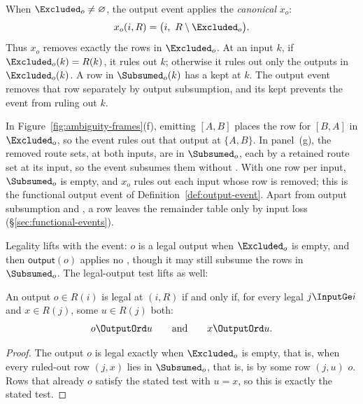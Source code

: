 \begin{definition}
\label{def:canonical-commitment}
When $\Excluded_o\neq\varnothing$, the output event applies the \emph{canonical
\commitment} $x_o$:
\begin{equation}
  x_o(i,R)=\bigl(i,\ R\setminus\Excluded_o\bigr).
  \label{eq:canonical-commitment-relational}
\end{equation}
  Thus $x_o$ removes exactly the rows in $\Excluded_o$.  At an input $k$, if
  $\Excluded_o(k)=R(k)$, it rules out $k$; otherwise it rules out only the
  outputs in $\Excluded_o(k)$.  A row in $\Subsumed_o(k)$ has a kept \outnoun
  at $k$.  The output event removes that row separately by output subsumption,
  and its kept \outnoun prevents the event from ruling out $k$.
\end{definition}

In Figure~\ref{fig:ambiguity-frames}(f), emitting $[A,B]$ places the row for
$[B,A]$ in $\Excluded_o$, so the event rules out that output at $\{A,B\}$.
In panel~(g), the removed route sets, at both inputs, are in $\Subsumed_o$,
each \outrelpast by a retained route set at its input, so the event subsumes them without
\commitment.  With one row per input, $\Subsumed_o$ is empty, and $x_o$ rules
out each input whose row is removed; this is the functional output event of
Definition~\ref{def:output-event}.  Apart from output subsumption and
\commitments, a row leaves the remainder table only by input loss
(\S\ref{sec:functional-events}).

Legality lifts with the event: $o$ is a legal output when $\Excluded_o$ is
empty, and then $\mathsf{output}(o)$ applies no \commitment, though it may
still subsume the rows in $\Subsumed_o$.  The legal-output test lifts as well:

\begin{proposition}
\label{prop:exposability}
An output $o\in R(i)$ is legal at $(i,R)$ if and only if, for every legal
$j\InputGe i$ and $x\in R(j)$, some $u\in R(j)$ \outrel both:
\begin{equation}
  o\OutputOrd u
  \qquad\text{and}\qquad
  x\OutputOrd u.
  \label{eq:safe-exposure}
\end{equation}
\end{proposition}

\begin{proof}
The output $o$ is legal exactly when $\Excluded_o$ is empty, that is, when every
ruled-out row $(j,x)$ lies in $\Subsumed_o$, that is, is \outrelpast by some row
$(j,u)$ \outrelpart $o$.  Rows that already \outrelbase $o$ satisfy the stated
test with $u=x$, so this is exactly the stated test.
\end{proof}

